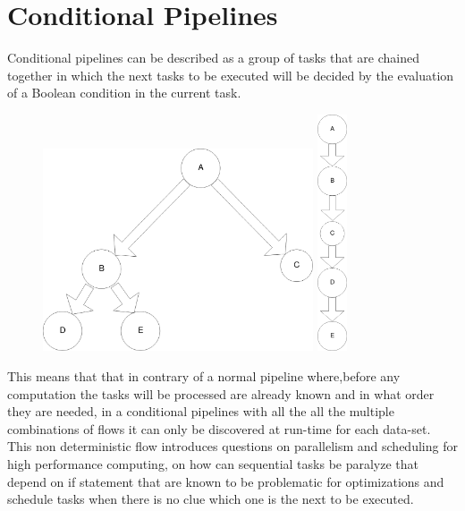\section{Conditional Pipelines}
Conditional pipelines can be described as a group of tasks that are chained together in which the next tasks to be executed will be decided by the evaluation of a Boolean condition in the current task. 
\begin{figure}[htb!]
\includegraphics[width=8cm]{latex/img/Named-graph.png}
\qquad
\includegraphics[height=7cm]{latex/img/ClassicPipeline.png}
\end{figure}

This means that that in contrary of a normal pipeline where,before any computation the tasks will be processed are already known and in what order they are needed, in a conditional pipelines with all the all the multiple combinations of flows it can only be discovered at run-time for each data-set.
This non deterministic flow introduces questions on parallelism and scheduling for high performance computing, on how can sequential tasks be paralyze that depend on if statement that are known to be problematic for optimizations  and schedule tasks when there is no clue which one is the next to be executed.


